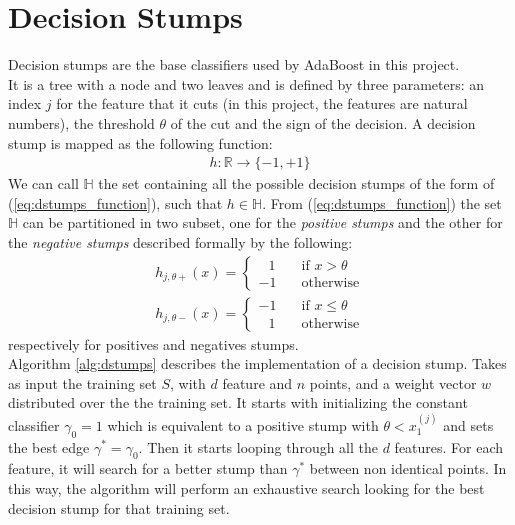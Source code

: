 
\chapter{Decision Stumps}
Decision stumps are the base classifiers used by AdaBoost in this project.\\
It is a tree with a node and two leaves and is defined by three parameters: an index $j$ for the feature that it cuts (in this project, the features are natural numbers), the threshold $\theta$ of the cut and the sign of the decision. A decision stump is mapped as the following function:
\begin{align}
\label{eq:dstumps_function}
	h:\mathbb{R} \to \lbrace-1, +1\rbrace
\end{align}
We can call $\mathbb{H}$ the set containing all the possible decision stumps of the form of (\ref{eq:dstumps_function}), such that $h \in \mathbb{H}$. From (\ref{eq:dstumps_function}) the set $\mathbb{H}$ can be partitioned in two subset, one for the \textit{positive stumps} and the other for the \textit{negative stumps} described formally by the following:
\begin{align}
h_{j, \theta+}(x) =
\begin{cases}
\;\;\,1       & \quad \text{if } x > \theta\\
-1  & \quad \text{otherwise}
\end{cases}
\\
h_{j,\theta-}(x) =
\begin{cases}
-1			& \quad \text{if } x \leq \theta\\
\;\;\,1		& \quad \text{otherwise}
\end{cases}
\end{align}
respectively for positives and negatives stumps.\\
Algorithm \ref{alg:dstumps} describes the implementation of a decision stump. Takes as input the training set $S$, with $d$ feature and $n$ points, and a weight vector $w$ distributed over the the training set. It starts with initializing the constant classifier $\gamma_{0} = 1$ which is equivalent to a positive stump with $\theta < x_{1}^{(j)}$ and sets the best edge $\gamma^{*} = \gamma_{0}$. Then it starts looping through all the $d$ features. For each feature, it will search for a better stump than $\gamma^{*}$ between non identical points. In this way, the algorithm will perform an exhaustive search looking for the best decision stump for that training set.

